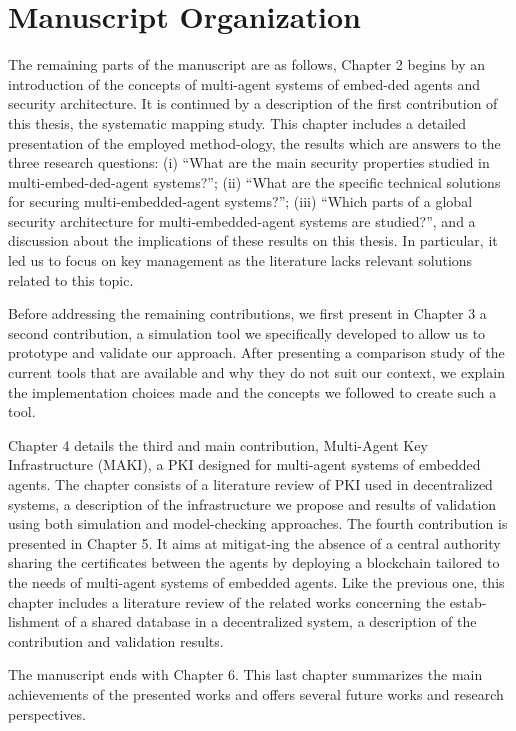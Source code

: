 \section{Manuscript Organization}

The remaining parts of the manuscript are as follows, Chapter 2 begins by an introduction of the concepts of multi-agent systems of embed-ded agents and security architecture. It is continued by a description of the first contribution of this thesis, the systematic mapping study.
This chapter includes a detailed presentation of the employed method-ology, the results which are answers to the three research questions:
(i) “What are the main security properties studied in multi-embed-ded-agent systems?”; (ii) “What are the specific technical solutions for securing multi-embedded-agent systems?”; (iii) “Which parts of a global security architecture for multi-embedded-agent systems are studied?”, and a discussion about the implications of these results on this thesis. In particular, it led us to focus on key management as the literature lacks relevant solutions related to this topic.

Before addressing the remaining contributions, we first present in Chapter 3 a second contribution, a simulation tool we specifically developed to allow us to prototype and validate our approach. After presenting a comparison study of the current tools that are available and why they do not suit our context, we explain the implementation choices made and the concepts we followed to create such a tool.

Chapter 4 details the third and main contribution, Multi-Agent Key Infrastructure (MAKI), a PKI designed for multi-agent systems of embedded agents. The chapter consists of a literature review of PKI used in decentralized systems, a description of the infrastructure we propose and results of validation using both simulation and model-checking approaches.
The fourth contribution is presented in Chapter 5. It aims at mitigat-ing the absence of a central authority sharing the certificates between the agents by deploying a blockchain tailored to the needs of multi-agent systems of embedded agents. Like the previous one, this chapter includes a literature review of the related works concerning the estab-lishment of a shared database in a decentralized system, a description of the contribution and validation results.

The manuscript ends with Chapter 6. This last chapter summarizes the main achievements of the presented works and offers several future works and research perspectives.